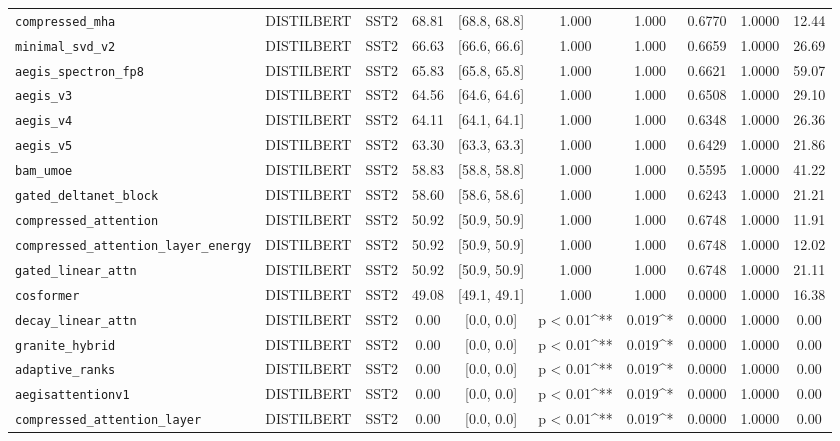 \begin{table}[t]
\begin{tabular}{l l l c c c c c c c}
\texttt{compressed\_mha} & DISTILBERT & SST2 & 68.81 & [68.8, 68.8] & 1.000 & 1.000 & 0.6770 & 1.0000 & 12.44 \\
\texttt{minimal\_svd\_v2} & DISTILBERT & SST2 & 66.63 & [66.6, 66.6] & 1.000 & 1.000 & 0.6659 & 1.0000 & 26.69 \\
\texttt{aegis\_spectron\_fp8} & DISTILBERT & SST2 & 65.83 & [65.8, 65.8] & 1.000 & 1.000 & 0.6621 & 1.0000 & 59.07 \\
\texttt{aegis\_v3} & DISTILBERT & SST2 & 64.56 & [64.6, 64.6] & 1.000 & 1.000 & 0.6508 & 1.0000 & 29.10 \\
\texttt{aegis\_v4} & DISTILBERT & SST2 & 64.11 & [64.1, 64.1] & 1.000 & 1.000 & 0.6348 & 1.0000 & 26.36 \\
\texttt{aegis\_v5} & DISTILBERT & SST2 & 63.30 & [63.3, 63.3] & 1.000 & 1.000 & 0.6429 & 1.0000 & 21.86 \\
\texttt{bam\_umoe} & DISTILBERT & SST2 & 58.83 & [58.8, 58.8] & 1.000 & 1.000 & 0.5595 & 1.0000 & 41.22 \\
\texttt{gated\_deltanet\_block} & DISTILBERT & SST2 & 58.60 & [58.6, 58.6] & 1.000 & 1.000 & 0.6243 & 1.0000 & 21.21 \\
\texttt{compressed\_attention} & DISTILBERT & SST2 & 50.92 & [50.9, 50.9] & 1.000 & 1.000 & 0.6748 & 1.0000 & 11.91 \\
\texttt{compressed\_attention\_layer\_energy} & DISTILBERT & SST2 & 50.92 & [50.9, 50.9] & 1.000 & 1.000 & 0.6748 & 1.0000 & 12.02 \\
\texttt{gated\_linear\_attn} & DISTILBERT & SST2 & 50.92 & [50.9, 50.9] & 1.000 & 1.000 & 0.6748 & 1.0000 & 21.11 \\
\texttt{cosformer} & DISTILBERT & SST2 & 49.08 & [49.1, 49.1] & 1.000 & 1.000 & 0.0000 & 1.0000 & 16.38 \\
\texttt{decay\_linear\_attn} & DISTILBERT & SST2 & 0.00 & [0.0, 0.0] & p < 0.01^{**} & 0.019^* & 0.0000 & 1.0000 & 0.00 \\
\texttt{granite\_hybrid} & DISTILBERT & SST2 & 0.00 & [0.0, 0.0] & p < 0.01^{**} & 0.019^* & 0.0000 & 1.0000 & 0.00 \\
\texttt{adaptive\_ranks} & DISTILBERT & SST2 & 0.00 & [0.0, 0.0] & p < 0.01^{**} & 0.019^* & 0.0000 & 1.0000 & 0.00 \\
\texttt{aegisattentionv1} & DISTILBERT & SST2 & 0.00 & [0.0, 0.0] & p < 0.01^{**} & 0.019^* & 0.0000 & 1.0000 & 0.00 \\
\texttt{compressed\_attention\_layer} & DISTILBERT & SST2 & 0.00 & [0.0, 0.0] & p < 0.01^{**} & 0.019^* & 0.0000 & 1.0000 & 0.00 \\

\end{tabular}
\end{table}
